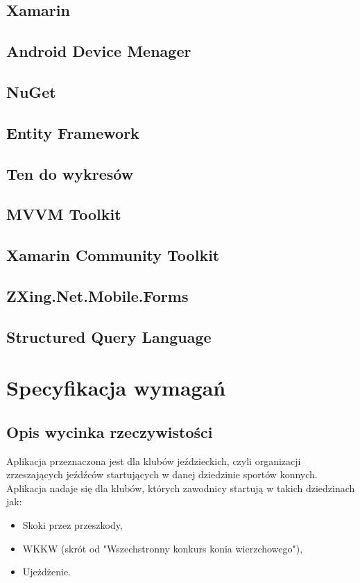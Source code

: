 \documentclass[12pt,twoside]{report}
\begin{document}
\section{Xamarin}
\section{Android Device Menager}
\section{NuGet}
\section{Entity Framework}
\section{Ten do wykresów}
\section{MVVM Toolkit}
\section{Xamarin Community Toolkit}
\section{ZXing.Net.Mobile.Forms}
\section{Structured Query Language}
\chapter{Specyfikacja wymagań}
\section{Opis wycinka rzeczywistości}
Aplikacja przeznaczona jest dla klubów jeździeckich, czyli organizacji zrzeszających jeźdźców startujących w danej dziedzinie sportów konnych. Aplikacja nadaje się dla klubów, których zawodnicy startują w takich dziedzinach jak:
\begin{itemize}
	\item Skoki przez przeszkody,
	\item WKKW (skrót od "Wszechstronny konkurs konia wierzchowego"),
	\item Ujeżdżenie.
\end{itemize}
\end{document}
